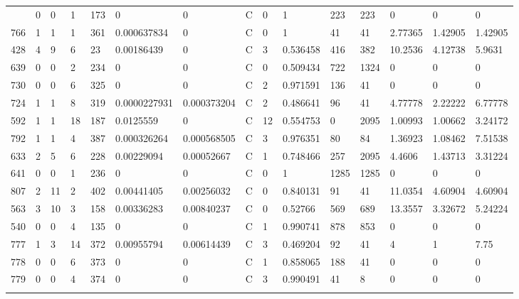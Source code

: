 \begin{latin}
\begin{longtable}{lllllllllllllll}
\begin{comment}
	578 & 0  & 0   & 1  & 173 & 0              & 0              & C & 0  & 1        & 223  & 223  & 0       & 0       & 0       \\
	766 & 1  & 1   & 1  & 361 & 0.000637834    & 0              & C & 0  & 1        & 41   & 41   & 2.77365 & 1.42905 & 1.42905 \\
	428 & 4  & 9   & 6  & 23  & 0.00186439     & 0              & C & 3  & 0.536458 & 416  & 382  & 10.2536 & 4.12738 & 5.9631  \\
	639 & 0  & 0   & 2  & 234 & 0              & 0              & C & 0  & 0.509434 & 722  & 1324 & 0       & 0       & 0       \\
	730 & 0  & 0   & 6  & 325 & 0              & 0              & C & 2  & 0.971591 & 136  & 41   & 0       & 0       & 0       \\
	724 & 1  & 1   & 8  & 319 & 0.0000227931   & 0.000373204    & C & 2  & 0.486641 & 96   & 41   & 4.77778 & 2.22222 & 6.77778 \\
	592 & 1  & 1   & 18 & 187 & 0.0125559      & 0              & C & 12 & 0.554753 & 0    & 2095 & 1.00993 & 1.00662 & 3.24172 \\
	792 & 1  & 1   & 4  & 387 & 0.000326264    & 0.000568505    & C & 3  & 0.976351 & 80   & 84   & 1.36923 & 1.08462 & 7.51538 \\
	633 & 2  & 5   & 6  & 228 & 0.00229094     & 0.00052667     & C & 1  & 0.748466 & 257  & 2095 & 4.4606  & 1.43713 & 3.31224 \\
	641 & 0  & 0   & 1  & 236 & 0              & 0              & C & 0  & 1        & 1285 & 1285 & 0       & 0       & 0       \\
	807 & 2  & 11  & 2  & 402 & 0.00441405     & 0.00256032     & C & 0  & 0.840131 & 91   & 41   & 11.0354 & 4.60904 & 4.60904 \\
	563 & 3  & 10  & 3  & 158 & 0.00336283     & 0.00840237     & C & 0  & 0.52766  & 569  & 689  & 13.3557 & 3.32672 & 5.24224 \\
	540 & 0  & 0   & 4  & 135 & 0              & 0              & C & 1  & 0.990741 & 878  & 853  & 0       & 0       & 0       \\
	777 & 1  & 3   & 14 & 372 & 0.00955794     & 0.00614439     & C & 3  & 0.469204 & 92   & 41   & 4       & 1       & 7.75    \\
	778 & 0  & 0   & 6  & 373 & 0              & 0              & C & 1  & 0.858065 & 188  & 41   & 0       & 0       & 0       \\
	779 & 0  & 0   & 4  & 374 & 0              & 0              & C & 3  & 0.990491 & 41   & 8    & 0       & 0       & 0       \\

\end{comment}
\end{longtable}
\end{latin}
